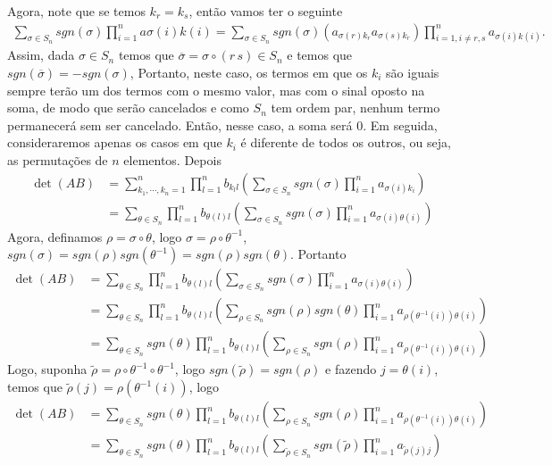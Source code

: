 \documentclass{article}
\begin{document}
Agora, note que se temos $k_r=k_s$, então vamos ter o seguinte
\begin{align*}
  \sum_{\sigma\in S_n}sgn(\sigma)\prod_{i=1}^{n}a\sigma(i)k(i)=  \sum_{\sigma\in S_n}sgn(\sigma)(a_{\sigma(r)k_r}a_{\sigma(s)k_r})\prod_{i=1,i\neq r,s}^{n}a_{\sigma(i)k(i)}.
\end{align*}
Assim, dada $\sigma\in S_n$ temos que $\overline{\sigma}=\sigma\circ (r\,s)\in S_n$ e temos que $sgn(\overline{\sigma})=-sgn(\sigma)$, Portanto, neste caso, os termos em que os $k_i$ são iguais sempre terão um dos termos com o mesmo valor, mas com o sinal oposto na soma, de modo que serão cancelados e como $S_n$ tem ordem par, nenhum termo permanecerá sem ser cancelado. Então, nesse caso, a soma será $0$. Em seguida, consideraremos apenas os casos em que $k_i$ é diferente de todos os outros, ou seja, as permutações de $n$ elementos. Depois
\begin{align*}
  \det(AB)&=\sum_{k_1,\cdots,k_n=1}^{n}\prod_{l=1}^{n}b_{k_{l}l}\left(\sum_{\sigma\in S_{n}}sgn(\sigma)\prod_{i=1}^{n}a_{\sigma(i)k_{i}}\right)\\
    &=\sum_{\theta\in S_n}\prod_{l=1}^{n}b_{\theta(l)l}\left(\sum_{\sigma\in S_{n}}sgn(\sigma)\prod_{i=1}^{n}a_{\sigma(i)\theta(i)}\right)
\end{align*}
Agora, definamos $\rho=\sigma\circ\theta$, logo $\sigma=\rho\circ\theta^{-1}$, $sgn(\sigma)=sgn(\rho)sgn(\theta^{-1})=sgn(\rho)sgn(\theta)$. Portanto
\begin{align*}
  \det(AB)&=\sum_{\theta\in S_n}\prod_{l=1}^{n}b_{\theta(l)l}\left(\sum_{\sigma\in S_{n}}sgn(\sigma)\prod_{i=1}^{n}a_{\sigma(i)\theta(i)}\right)\\
  &=\sum_{\theta\in S_n}\prod_{l=1}^{n}b_{\theta(l)l}\left(\sum_{\rho\in S_{n}}sgn(\rho)sgn(\theta)\prod_{i=1}^{n}a_{\rho(\theta^{-1}(i))\theta(i)}\right)\\
  &=\sum_{\theta\in S_n}sgn(\theta)\prod_{l=1}^{n}b_{\theta(l)l}\left(\sum_{\rho\in S_{n}}sgn(\rho)\prod_{i=1}^{n}a_{\rho(\theta^{-1}(i))\theta(i)}\right)
\end{align*}
Logo, suponha $\tilde{\rho}=\rho\circ \theta^{-1}\circ\theta^{-1}$, logo $sgn(\tilde{\rho})=sgn(\rho)$ e fazendo $j=\theta(i)$, temos que $\tilde{\rho}(j)=\rho(\theta^{-1}(i))$, logo 
\begin{align*}
  \det(AB)&=\sum_{\theta\in S_n}sgn(\theta)\prod_{l=1}^{n}b_{\theta(l)l}\left(\sum_{\rho\in S_{n}}sgn(\rho)\prod_{i=1}^{n}a_{\rho(\theta^{-1}(i))\theta(i)}\right)\\
  &=\sum_{\theta\in S_n}sgn(\theta)\prod_{l=1}^{n}b_{\theta(l)l}\left(\sum_{\tilde{\rho}\in S_{n}}sgn(\tilde{\rho})\prod_{i=1}^{n}a_{\tilde{\rho}(j)j}\right)
\end{align*}
\end{document}
